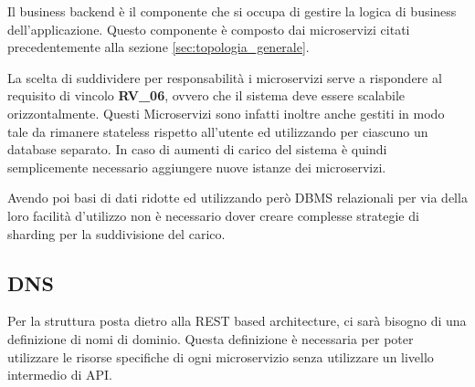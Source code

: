 Il business backend è il componente che si occupa di gestire la logica di business dell'applicazione. Questo componente è composto dai microservizi citati precedentemente alla sezione \ref{sec:topologia_generale}.

La scelta di suddividere per responsabilità i microservizi serve a rispondere al requisito di vincolo \textbf{RV\_06}, ovvero che il sistema deve essere scalabile orizzontalmente. Questi Microservizi sono infatti inoltre anche gestiti in modo tale da rimanere stateless rispetto all'utente ed utilizzando per ciascuno un database separato. In caso di aumenti di carico del sistema è quindi semplicemente necessario aggiungere nuove istanze dei microservizi.

Avendo poi basi di dati ridotte ed utilizzando però DBMS relazionali per via della loro facilità d'utilizzo non è necessario dover creare complesse strategie di sharding per la suddivisione del carico.

\subsection{DNS}

Per la struttura posta dietro alla REST based architecture, ci sarà bisogno di una definizione di nomi di dominio. Questa definizione è necessaria per poter utilizzare le risorse specifiche di ogni microservizio senza utilizzare un livello intermedio di API.

